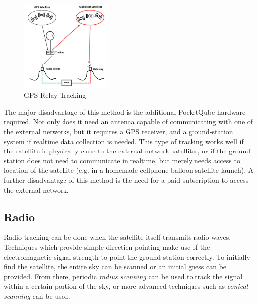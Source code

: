 \begin{figure}[!htb]
  \centering
  \includegraphics[width=0.4\textwidth]{gps_relay}
  \caption{GPS Relay Tracking \cite{site-highaltitudescienceTrackingWeather}}
  \label{fig:gps_relay}
\end{figure}

The major disadvantage of this method is the additional PocketQube hardware required. Not only does it need an antenna capable of communicating with one of the external networks, but it requires a GPS receiver, and a ground-station system if realtime data collection is needed. This type of tracking works well if the satellite is physically close to the external network satellites, or if the ground station does not need to communicate in realtime, but merely needs access to location of the satellite (e.g. in a homemade cellphone balloon satellite launch). A further disadvantage of this method is the need for a paid subscription to access the external network.


\subsection{Radio}
Radio tracking can be done when the satellite itself transmits radio waves. Techniques which provide simple direction pointing make use of the electromagnetic signal strength to point the ground station correctly. To initially find the satellite, the entire sky can be scanned or an initial guess can be provided. From there, periodic \textit{radius scanning} can be used to track the signal within a certain portion of the sky, or more advanced techniques such as \textit{conical scanning} can be used.
